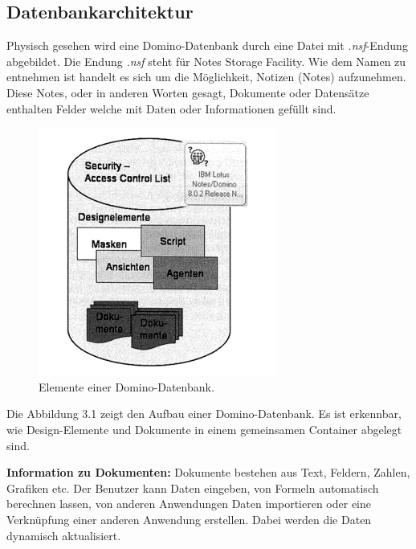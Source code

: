 \subsection{Datenbankarchitektur}
\label{sec:3dominoDB}

Physisch gesehen wird eine Domino-Datenbank durch eine Datei mit \textit{.nsf}-Endung abgebildet. Die Endung
\textit{.nsf} steht für Notes Storage Facility. Wie dem Namen zu entnehmen ist handelt es sich um die Möglichkeit, Notizen (Notes) aufzunehmen.
 Diese Notes, oder in anderen Worten gesagt, Dokumente oder Datensätze enthalten Felder welche mit Daten oder Informationen gefüllt sind\cite{ebel}.

\begin{figure}[H]
  \centerline{\includegraphics[scale=0.7]{pics/DB_container}}
  \caption[Elemente einer Domino-Datenbank]{\label{FiG:Elemente einer Domino-Datenbank }
  Elemente einer Domino-Datenbank\cite{ebel}.}
\end{figure}
\begin{flushleft}
Die Abbildung 3.1 zeigt den Aufbau einer Domino-Datenbank. Es ist erkennbar, wie Design-Elemente und Dokumente in einem gemeinsamen Container
abgelegt sind. 
\end{flushleft}


\vspace{1cm}
\begin{graybox}
\textbf{Information zu Dokumenten: }Dokumente bestehen aus Text, Feldern, Zahlen, Grafiken etc. Der Benutzer kann Daten eingeben, von Formeln
automatisch berechnen lassen, von anderen Anwendungen Daten importieren oder eine Verknüpfung einer anderen Anwendung erstellen. Dabei werden die
Daten dynamisch aktualisiert\cite{ebel}.
\end{graybox}

